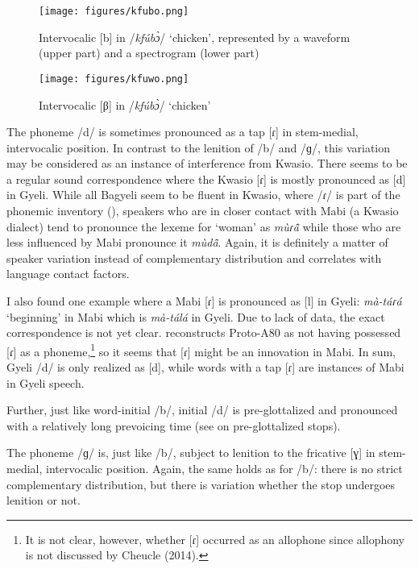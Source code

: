 \begin{figure}[p]
\texttt{[image: figures/kfubo.png]}
\caption{Intervocalic [b] in /{\itshape kfúbɔ̀}/ `chicken', represented by a waveform (upper part) and a spectrogram (lower part)}
\label{Fig:kfubo}
\end{figure}




\begin{figure}[p]
\texttt{[image: figures/kfuwo.png]}
\caption{Intervocalic [β] in /{\itshape kfúbɔ̀}/ `chicken'}
\label{Fig:kfuwo}
\end{figure}

 

 The phoneme /d/ is sometimes pronounced as a tap [ɾ] in stem-medial, intervocalic position. In contrast to the lenition of /b/ and /ɡ/, this variation may be considered as an instance of interference from Kwasio. There seems to be a regular sound correspondence where the Kwasio [ɾ] is mostly pronounced as [d] in Gyeli. While all Bagyeli seem to be fluent in Kwasio, where /ɾ/ is part of the phonemic inventory (\citealt[33]{woungly71}), speakers who are in closer contact with Mabi (a Kwasio dialect) tend to pronounce the lexeme for `woman' as {\itshape mùɾã̂} while those who are less influenced by Mabi pronounce it {\itshape mùdã̂}. Again, it is definitely a matter of speaker variation instead of complementary distribution and correlates with language contact factors.

I also found one example where a Mabi [ɾ] is pronounced as [l] in Gyeli:  {\itshape mà-táɾá} `beginning' in Mabi which is {\itshape mà-tálá} in Gyeli. Due to lack of data, the exact correspondence is not yet clear. \citet[432]{cheucle2014} reconstructs Proto-A80 as not having possessed [ɾ] as a phoneme,\footnote{It is not clear, however, whether  [ɾ] occurred as an allophone since allophony is not discussed by Cheucle (2014).} so it seems that [ɾ] might be an innovation in Mabi. In sum, Gyeli /d/ is only realized as [d], while words with a tap [ɾ] are instances of Mabi in Gyeli speech.

Further, just like word-initial /b/, initial /d/ is pre-glottalized and pronounced with a relatively long prevoicing time (see  on pre-glottalized stops).



 The phoneme /ɡ/ is, just like /b/, subject to lenition to the fricative [ɣ] in stem-medial, intervocalic position. Again, the same holds as for /b/: there is no strict complementary distribution, but there is variation whether the stop undergoes lenition or not.


